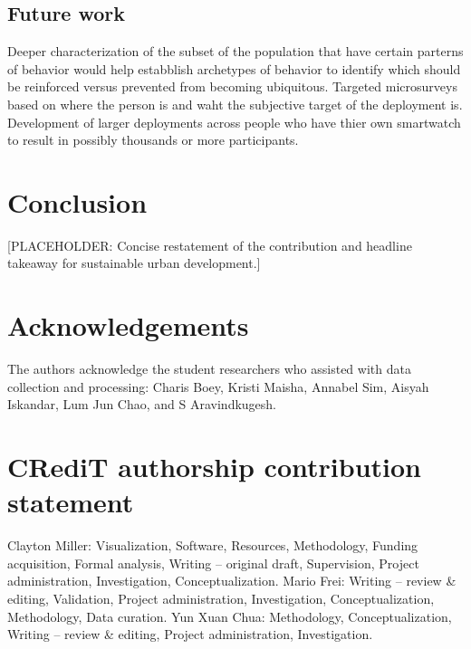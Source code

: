 \documentclass[]{interact}
\begin{document}
\subsection{Future work}\label{sec:disc-future}
Deeper characterization of the subset of the population that have certain parterns of behavior would help estabblish archetypes of behavior to identify which should be reinforced versus prevented from becoming ubiquitous. 
Targeted microsurveys based on where the person is and waht the subjective target of the deployment is.
Development of larger deployments across people who have thier own smartwatch to result in possibly thousands or more participants.



\section{Conclusion}\label{sec:conclusion}
[PLACEHOLDER: Concise restatement of the contribution and headline takeaway for
sustainable urban development.]


\section*{Acknowledgements}
The authors acknowledge the student researchers who assisted with data collection and processing: Charis Boey, Kristi Maisha, Annabel Sim, Aisyah Iskandar, Lum Jun Chao, and S Aravindkugesh.

\section*{CRediT authorship contribution statement}
Clayton Miller: Visualization, Software, Resources, Methodology, Funding acquisition, Formal analysis, Writing -- original draft, Supervision, Project administration, Investigation, Conceptualization. Mario Frei: Writing -- review \& editing, Validation, Project administration, Investigation, Conceptualization, Methodology, Data curation. Yun Xuan Chua: Methodology, Conceptualization, Writing -- review \& editing, Project administration, Investigation. 
\end{document}

